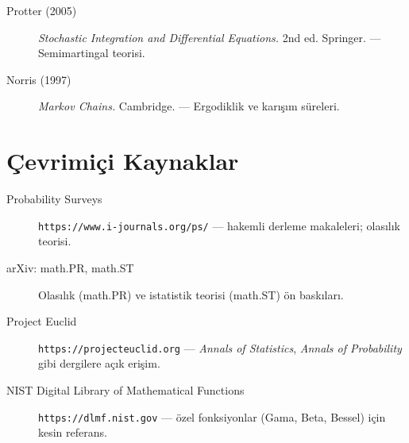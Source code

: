 \begin{description}
  \item[Protter (2005)] \textit{Stochastic Integration and Differential Equations.} 2nd ed. Springer. --- Semimartingal teorisi.
  \item[Norris (1997)] \textit{Markov Chains.} Cambridge. --- Ergodiklik ve karışım süreleri.
\end{description}

\section{Çevrimiçi Kaynaklar}

\begin{description}
  \item[Probability Surveys] \texttt{https://www.i-journals.org/ps/} --- hakemli derleme makaleleri; olasılık teorisi.
  \item[arXiv: math.PR, math.ST] Olasılık (math.PR) ve istatistik teorisi (math.ST) ön baskıları.
  \item[Project Euclid] \texttt{https://projecteuclid.org} --- \textit{Annals of Statistics}, \textit{Annals of Probability} gibi dergilere açık erişim.
  \item[NIST Digital Library of Mathematical Functions] \texttt{https://dlmf.nist.gov} --- özel fonksiyonlar (Gama, Beta, Bessel) için kesin referans.
\end{description}
